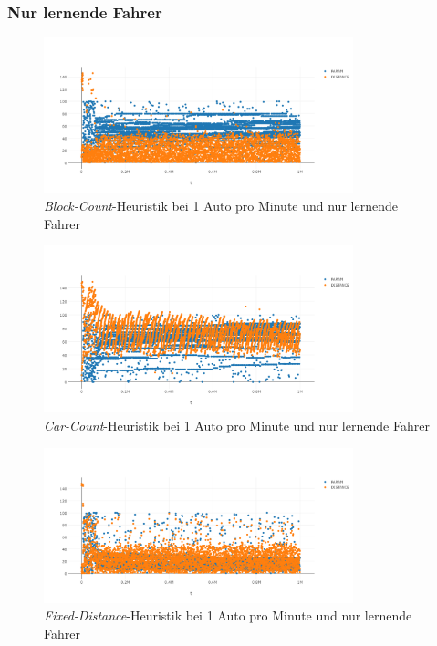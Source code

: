 \subsubsection*{Nur lernende Fahrer}
\begin{figure}[H]
	\includegraphics[width=0.8\textwidth]{analyse/JustHeuristik/1pm/block1just.png}
	\caption{\emph{Block-Count}-Heuristik bei 1 Auto pro Minute und nur lernende Fahrer}\label{fig:ap_jh_bs_1}
\end{figure}
\begin{figure}[H]
	\includegraphics[width=0.8\textwidth]{analyse/JustHeuristik/1pm/car1just.png}
	\caption{\emph{Car-Count}-Heuristik bei 1 Auto pro Minute und nur lernende Fahrer}\label{fig:ap_jh_cc_1}
\end{figure}
\begin{figure}[H]
	\includegraphics[width=0.8\textwidth]{analyse/JustHeuristik/1pm/fixed1just.png}
	\caption{\emph{Fixed-Distance}-Heuristik bei 1 Auto pro Minute und nur lernende Fahrer}\label{fig:ap_jh_fd_1}
\end{figure}
